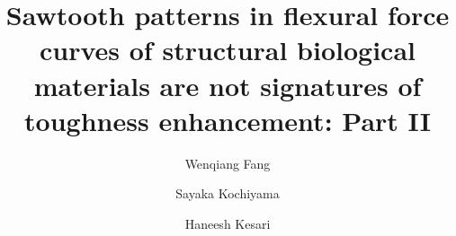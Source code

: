 \documentclass[preprint,10pt,times]{elsarticle}
\numberwithin{equation}{section}
\begin{document}
\begin{frontmatter}



\title{Sawtooth patterns in flexural force curves of structural biological
materials are not signatures of toughness enhancement: Part II}


\author{Wenqiang Fang}
\author{Sayaka Kochiyama}
\author{Haneesh Kesari}

\address{Brown University, School of Engineering, 184 Hope Street, Providence, RI, USA}


\end{frontmatter}
\end{document}
